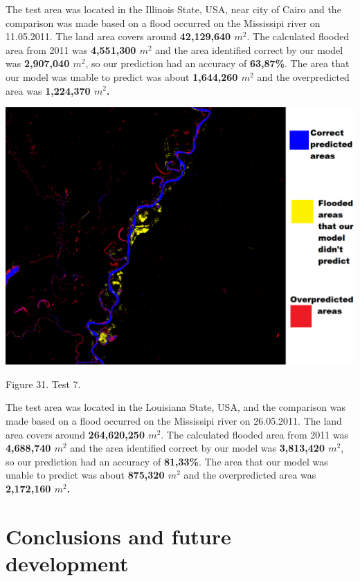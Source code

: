 \documentclass[12pt, a4paper]{report}
\begin{document}
The test area was located in the Illinois State, USA, near city of Cairo and the comparison was made based on a flood occurred on the Mississipi river on 11.05.2011. The land area covers around \textbf{42,129,640 $m^2$}. The calculated flooded area from 2011 was \textbf{4,551,300 $m^2$} and the area identified correct by our model was \textbf{2,907,040 $m^2$}, so our prediction had an accuracy of \textbf{63,87\%}. The area that our model was unable to predict was about \textbf{1,644,260 $m^2$} and the overpredicted area was \textbf{1,224,370 $m^2$.}

\newpage

\bigskip
\includegraphics[scale=0.5, center]{test_7.png}
\begin{center}
Figure 31. Test 7.
\end{center}
\par 

The test area was located in the Louisiana State, USA, and the comparison was made based on a flood occurred on the Mississipi river on 26.05.2011. The land area covers around \textbf{264,620,250 $m^2$}. The calculated flooded area from 2011 was \textbf{4,688,740 $m^2$} and the area identified correct by our model was \textbf{3,813,420 $m^2$}, so our prediction had an accuracy of \textbf{81,33\%}. The area that our model was unable to predict was about \textbf{875,320 $m^2$} and the overpredicted area was \textbf{2,172,160 $m^2$.}



\clearpage

\chapter{Conclusions and future development}
\end{document}
